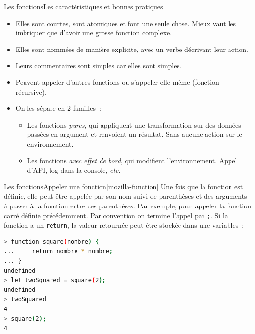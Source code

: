 \documentclass{beamer}
\begin{document}
    \begin{frame}{Les fonctions}{Les caractéristiques et bonnes pratiques}
        \begin{itemize}
            \item Elles sont courtes, sont atomiques et font une seule chose.
            Mieux vaut les imbriquer que d'avoir une grosse fonction complexe.
            \item Elles sont nommées de manière explicite, avec un verbe décrivant leur action.
            \item Leurs commentaires sont simples car elles sont simples.
            \item Peuvent appeler d'autres fonctions ou s'appeler elle-même (fonction récursive).
            \item On les sépare en 2 familles~:
            \begin{itemize}
                \item Les fonctions \textit{pures}, qui appliquent une transformation sur des données passées en argument et renvoient un résultat.
                Sans aucune action sur le environnement.
                \item Les fonctions \textit{avec effet de bord}, qui modifient l'environnement.
                Appel d'API, log dans la console, \textit{etc}.
            \end{itemize}
        \end{itemize}
    \end{frame}

    \begin{frame}[fragile]{Les fonctions}{Appeler une fonction\cref{mozilla-function}}
        Une fois que la fonction est définie, elle peut être appelée par son nom suivi de parenthèses et des arguments à passer à la fonction entre ces parenthèses.
        Par exemple, pour appeler la fonction carré définie précédemment.
        Par convention on termine l'appel par \lstinline{;}.
        Si la fonction a un \lstinline{return}, la valeur retournée peut être stockée dans une variables~:
        \begin{lstlisting}[language=Bash]
> function square(nombre) {
...     return nombre * nombre;
... }
undefined
> let twoSquared = square(2);
undefined
> twoSquared
4
> square(2);
4
        \end{lstlisting}
    \end{frame}
\end{document}
